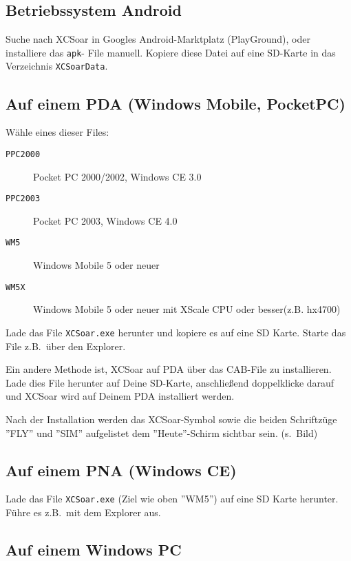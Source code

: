 \subsection*{Betriebssystem Android}

Suche nach {\textsf  XCSoar} in Googles Android-Marktplatz (PlayGround), oder installiere das \verb|apk|-
File manuell.  Kopiere diese Datei auf eine SD-Karte in das Verzeichnis \verb|XCSoarData|.

\subsection*{Auf einem PDA (Windows Mobile, PocketPC)}

Wähle eines dieser Files:

\begin{description}
\item[\texttt{PPC2000}] Pocket PC 2000/2002, Windows CE 3.0
\item[\texttt{PPC2003}] Pocket PC 2003, Windows CE 4.0
\item[\texttt{WM5}] Windows Mobile 5 oder neuer
\item[\texttt{WM5X}]Windows Mobile 5 oder neuer mit XScale CPU oder besser(z.B. hx4700)
\end{description}

Lade das File \verb|XCSoar.exe| herunter und kopiere es auf eine SD Karte.  
Starte das File z.B.\ über den Explorer. 

Ein andere Methode ist, {\textsf  XCSoar} auf PDA über das CAB-File zu installieren.  Lade dies File herunter auf Deine SD-Karte, 
anschließend  doppelklicke darauf und {\textsf  XCSoar} wird auf Deinem PDA installiert werden. 

Nach der Installation werden das {\textsf  XCSoar}-Symbol sowie die beiden Schriftzüge ''FLY'' und ''SIM'' aufgelistet
dem ''Heute''-Schirm sichtbar sein. (s.\ Bild) 


\subsection*{Auf einem PNA (Windows CE)}

Lade das File \verb|XCSoar.exe| (Ziel wie oben ''WM5'') auf eine SD Karte herunter. 
Führe es z.B.\ mit dem Explorer aus.

\subsection*{Auf einem Windows PC}
  

